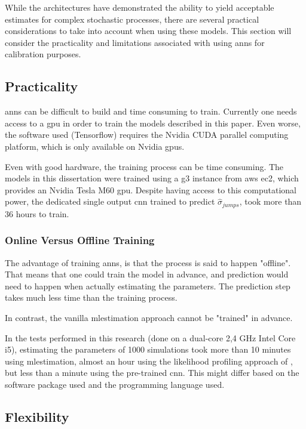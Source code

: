 \documentclass[11pt,oneside,openany,a4paper,english, report, goldenblock
]{usthesis}
\begin{document}
While the architectures have demonstrated the ability to yield acceptable estimates for complex stochastic processes, there are several practical considerations to take into account when using these models. This section will consider the practicality and limitations associated with using \acrshort{ann}s for calibration purposes.

\subsection{Practicality}
\acrshort{ann}s can be difficult to build and time consuming to train. Currently one needs access to a \acrfull{gpu} in order to train the models described in this paper. Even worse, the software used (Tensorflow\texttrademark \xspace \citep{tensorflow2015-whitepaper}) requires the Nvidia CUDA\textregistered \xspace parallel computing platform, which is only available on Nvidia \acrshort{gpu}s.

Even with good hardware, the training process can be time consuming. The models in this dissertation were trained using a g3 instance from \acrfull{aws} \acrfull{ec2}, which provides an Nvidia Tesla M60 \acrshort{gpu}. Despite having access to this computational power, the dedicated single output \acrshort{cnn} trained to predict $\hat{\sigma}_{jumps}$, took more than 36 hours to train.

\subsubsection{Online Versus Offline Training}
The advantage of training \acrshort{ann}s, is that the process is said to happen "offline". That means that one could train the model in advance, and prediction would need to happen when actually estimating the parameters. The prediction step takes much less time than the training process. 

In contrast, the vanilla \acrshort{mlestimation} approach cannot be "trained" in advance. 

In the tests performed in this research (done on a dual-core 2,4 GHz Intel Core i5), estimating the parameters of 1000 simulations took more than 10 minutes using \acrshort{mlestimation}, almost an hour using the likelihood profiling approach of \citet{Honore}, but less than a minute using the pre-trained \acrshort{cnn}. This might differ based on the software package used and the programming language used. 

\subsection{Flexibility}
\end{document}
